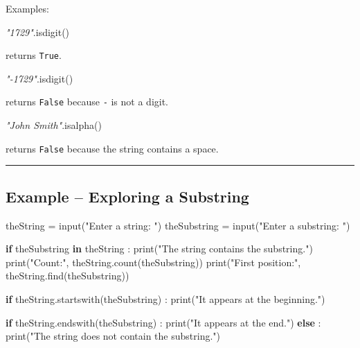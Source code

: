 \documentclass[
  11pt,
  a4paper,
]{article}
\newenvironment{Shaded}{}{}
\newcommand{\BuiltInTok}[1]{\textcolor[rgb]{0.00,0.50,0.00}{#1}}
\newcommand{\CommentTok}[1]{\textcolor[rgb]{0.38,0.63,0.69}{\textit{#1}}}
\newcommand{\ControlFlowTok}[1]{\textcolor[rgb]{0.00,0.44,0.13}{\textbf{#1}}}
\newcommand{\KeywordTok}[1]{\textcolor[rgb]{0.00,0.44,0.13}{\textbf{#1}}}
\newcommand{\NormalTok}[1]{#1}
\newcommand{\OperatorTok}[1]{\textcolor[rgb]{0.40,0.40,0.40}{#1}}
\newcommand{\StringTok}[1]{\textcolor[rgb]{0.25,0.44,0.63}{#1}}
\begin{document}
Examples:

\begin{Shaded}
\begin{Highlighting}[]
\CommentTok{"1729"}\NormalTok{.isdigit()}
\end{Highlighting}
\end{Shaded}

returns \texttt{True}.

\begin{Shaded}
\begin{Highlighting}[]
\CommentTok{"{-}1729"}\NormalTok{.isdigit()}
\end{Highlighting}
\end{Shaded}

returns \texttt{False} because \texttt{-} is not a digit.

\begin{Shaded}
\begin{Highlighting}[]
\CommentTok{"John Smith"}\NormalTok{.isalpha()}
\end{Highlighting}
\end{Shaded}

returns \texttt{False} because the string contains a space.

\begin{center}\rule{0.5\linewidth}{0.5pt}\end{center}

\subsection{Example -- Exploring a
Substring}\label{example-exploring-a-substring}

\begin{Shaded}
\begin{Highlighting}[]
\NormalTok{theString }\OperatorTok{=} \BuiltInTok{input}\NormalTok{(}\StringTok{"Enter a string: "}\NormalTok{)}
\NormalTok{theSubstring }\OperatorTok{=} \BuiltInTok{input}\NormalTok{(}\StringTok{"Enter a substring: "}\NormalTok{)}

\ControlFlowTok{if}\NormalTok{ theSubstring }\KeywordTok{in}\NormalTok{ theString :}
    \BuiltInTok{print}\NormalTok{(}\StringTok{"The string contains the substring."}\NormalTok{)}
    \BuiltInTok{print}\NormalTok{(}\StringTok{"Count:"}\NormalTok{, theString.count(theSubstring))}
    \BuiltInTok{print}\NormalTok{(}\StringTok{"First position:"}\NormalTok{, theString.find(theSubstring))}

    \ControlFlowTok{if}\NormalTok{ theString.startswith(theSubstring) :}
        \BuiltInTok{print}\NormalTok{(}\StringTok{"It appears at the beginning."}\NormalTok{)}

    \ControlFlowTok{if}\NormalTok{ theString.endswith(theSubstring) :}
        \BuiltInTok{print}\NormalTok{(}\StringTok{"It appears at the end."}\NormalTok{)}
\ControlFlowTok{else}\NormalTok{ :}
    \BuiltInTok{print}\NormalTok{(}\StringTok{"The string does not contain the substring."}\NormalTok{)}
\end{Highlighting}
\end{Shaded}
\end{document}
